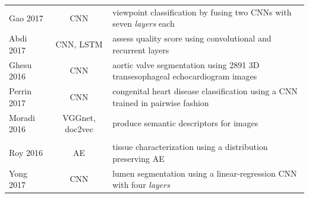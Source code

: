 \documentclass[journal]{IEEEtran}
\begin{document}
\begin{table}[!t]
\begin{minipage}{\textwidth}
\begin{tabularx}{\textwidth}{l c l}
			Gao 2017\cite{gao2017fused}                  & CNN             & viewpoint classification by fusing two CNNs with seven \textit{layers} each                                                                                                                                                      \\
			Abdi 2017\cite{abdi2017quality}              & CNN, LSTM       & assess quality score using convolutional and recurrent layers                                                                                                                                                                    \\
			Ghesu 2016\cite{ghesu2016marginal}           & CNN             & aortic valve segmentation using 2891 3D transesophageal echocardiogram images                                                                                                                                                    \\
			Perrin 2017\cite{perrin2017application}      & CNN             & congenital heart disease classification using a CNN trained in pairwise fashion                                                                                                                                                  \\
			Moradi 2016\cite{moradi2016cross}            & VGGnet, doc2vec & produce semantic descriptors for images                                                                                                                                                                                          \\
			\midrule
			\multicolumn{3}{l}{\thead{OCT}}                                                                                                                                                                                                                                                                   \\
			\midrule
			Roy 2016\cite{roy2016multiscale}             & AE              & tissue characterization using a distribution preserving AE                                                                                                                                                                       \\
			Yong 2017\cite{yong2017linear}               & CNN             & lumen segmentation using a linear-regression CNN with four \textit{layers}                                                                                                                                                       \\

\end{tabularx}
\end{minipage}
\end{table}
\end{document}
